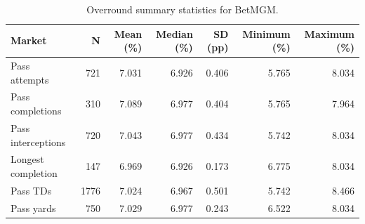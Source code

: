 \begin{table}
\caption{Overround summary statistics for BetMGM.}
\label{tab:overround_betmgm}
\begin{tabular}{lrrrrrr}
\toprule
Market & N & Mean (\%) & Median (\%) & SD (pp) & Minimum (\%) & Maximum (\%) \\
\midrule
Pass attempts & 721 & 7.031 & 6.926 & 0.406 & 5.765 & 8.034 \\
Pass completions & 310 & 7.089 & 6.977 & 0.404 & 5.765 & 7.964 \\
Pass interceptions & 720 & 7.043 & 6.977 & 0.434 & 5.742 & 8.034 \\
Longest completion & 147 & 6.969 & 6.926 & 0.173 & 6.775 & 8.034 \\
Pass TDs & 1776 & 7.024 & 6.967 & 0.501 & 5.742 & 8.466 \\
Pass yards & 750 & 7.029 & 6.977 & 0.243 & 6.522 & 8.034 \\
\bottomrule
\end{tabular}
\end{table}

